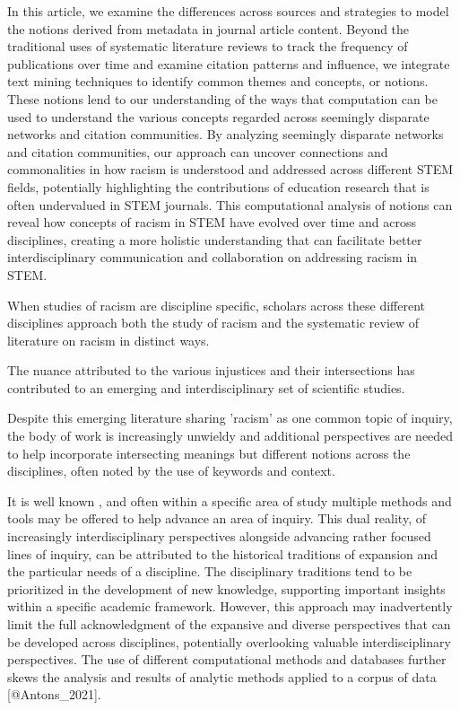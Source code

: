 In this article, we examine the differences across sources and strategies to model the notions derived from metadata in journal article content. 
Beyond the traditional uses of systematic literature reviews to track the frequency of publications over time and examine citation patterns and influence, we integrate text mining techniques to identify common themes and concepts, or notions. 
These notions lend to our understanding of the ways that computation can be used to understand the various concepts regarded across seemingly disparate networks and citation communities. 
By analyzing seemingly disparate networks and citation communities, our approach can uncover connections and commonalities in how racism is understood and addressed across different STEM fields, potentially highlighting the contributions of education research that is often undervalued in STEM journals. 
This computational analysis of notions can reveal how concepts of racism in STEM have evolved over time and across disciplines, creating a more holistic understanding that can facilitate better interdisciplinary communication and collaboration on addressing racism in STEM. 

When studies of racism are discipline specific, scholars across these different disciplines approach both the study of racism and the systematic review of literature on racism in distinct ways.

The nuance attributed to the various injustices and their intersections has contributed to an emerging and interdisciplinary set of scientific studies.

Despite this emerging literature sharing 'racism' as one common topic of inquiry, the body of work is increasingly unwieldy and additional perspectives are needed to help incorporate intersecting meanings but different notions across the disciplines, often noted by the use of keywords and context.

It is well known , and often within a specific area of study multiple methods and tools may be offered to help advance an area of inquiry.
This dual reality, of increasingly interdisciplinary perspectives alongside advancing rather focused lines of inquiry, can be attributed to the historical traditions of expansion and the particular needs of a discipline. 
The disciplinary traditions tend to be prioritized in the development of new knowledge, supporting important insights within a specific academic framework. 
However, this approach may inadvertently limit the full acknowledgment of the expansive and diverse perspectives that can be developed across disciplines, potentially overlooking valuable interdisciplinary perspectives. 
The use of different computational methods and databases further skews the analysis and results of analytic methods applied to a corpus of data [@Antons_2021]. 

